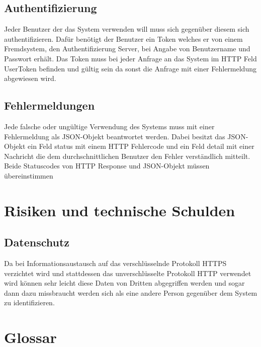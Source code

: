 \documentclass[]{report}
\begin{document}
\subsection{Authentifizierung}
Jeder Benutzer der das System verwenden will muss sich gegenüber diesem sich authentifizieren.
Dafür benötigt der Benutzer ein Token welches er von einem Fremdsystem, den Authentifizierung Server, bei
Angabe von Benutzername und  Passwort erhält. Das Token muss bei jeder Anfrage an das System im HTTP Feld UserToken befinden und gültig sein
da sonst die Anfrage mit einer Fehlermeldung abgewiesen wird. 

\subsection{Fehlermeldungen}
Jede falsche oder ungültige Verwendung des Systems muss mit einer Fehlermeldung als JSON-Objekt beantwortet werden.
Dabei besitzt das JSON-Objekt ein Feld status mit einem HTTP Fehlercode und ein Feld detail mit einer Nachricht die dem 
durchschnittlichen Benutzer den Fehler verständlich mitteilt. Beide Statuscodes von HTTP Response und JSON-Objekt müssen übereinstimmen

\section{Risiken und technische Schulden}\label{section-technical-risks}
\subsection{Datenschutz}
Da bei Informationsaustausch auf das verschlüsselnde Protokoll HTTPS verzichtet wird und stattdessen
das unverschlüsselte Protokoll HTTP verwendet wird können sehr leicht diese Daten von Dritten abgegriffen werden
und sogar dann dazu missbraucht werden sich als eine andere Person gegenüber dem System zu identifizieren. 
\section{Glossar}\label{section-glossary}
\end{document}

